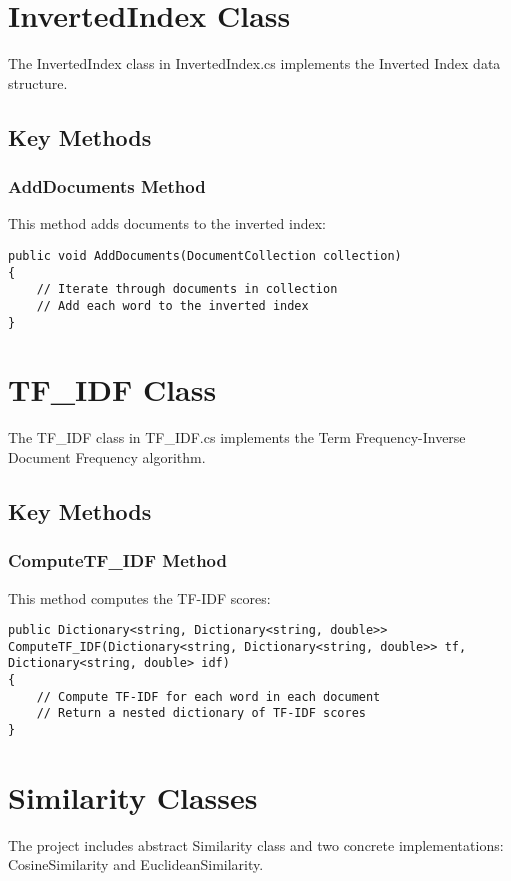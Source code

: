 \documentclass{article}
\begin{document}
\section{InvertedIndex Class}
The InvertedIndex class in InvertedIndex.cs implements the Inverted Index data structure.

\subsection{Key Methods}
\subsubsection{AddDocuments Method}
This method adds documents to the inverted index:

\begin{lstlisting}
public void AddDocuments(DocumentCollection collection)
{
    // Iterate through documents in collection
    // Add each word to the inverted index
}
\end{lstlisting}

\section{TF\_IDF Class}
The TF\_IDF class in TF\_IDF.cs implements the Term Frequency-Inverse Document Frequency algorithm.

\subsection{Key Methods}
\subsubsection{ComputeTF\_IDF Method}
This method computes the TF-IDF scores:

\begin{lstlisting}
public Dictionary<string, Dictionary<string, double>> ComputeTF_IDF(Dictionary<string, Dictionary<string, double>> tf, Dictionary<string, double> idf)
{
    // Compute TF-IDF for each word in each document
    // Return a nested dictionary of TF-IDF scores
}
\end{lstlisting}

\section{Similarity Classes}
The project includes abstract Similarity class and two concrete implementations: CosineSimilarity and EuclideanSimilarity.
\end{document}
